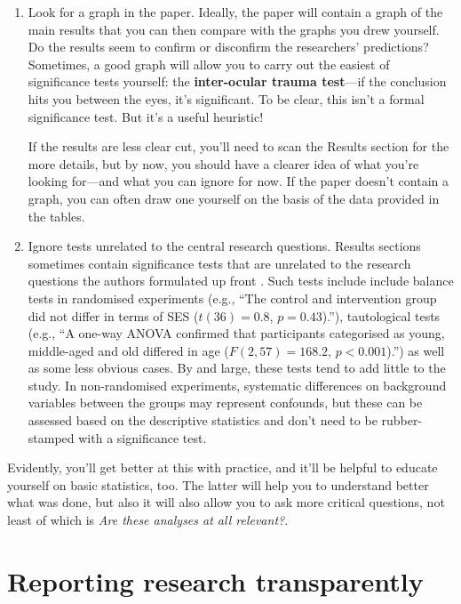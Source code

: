 \documentclass[a4paper]{tufte-book}\usepackage[]{graphicx}\usepackage[]{xcolor}
\newcommand{\term}[1]{\textbf{#1}}
\begin{document}
\begin{enumerate}
  Also see 
  \href{https://janhove.github.io/posts/2025-10-10-mock-outcomes/}{\textit{Clarifying research questions by sketching possible outcomes}}.
  
  \item Look for a graph in the paper.
Ideally, the paper will contain a graph of the main results 
that you can then compare with the graphs you drew yourself. 
Do the results seem to confirm or disconfirm the researchers' predictions? 
Sometimes, a good graph will allow you to carry out the easiest of significance tests yourself: 
the \term{inter-ocular trauma test}---if the conclusion hits you between the eyes, it's significant.
To be clear, this isn't a formal significance test. But it's a useful heuristic!

If the results are less clear cut, you'll need to scan the Results section 
for the more details, but by now, you should have a clearer idea of what you're 
looking for---and what you can ignore for now. If the paper doesn't contain a 
graph, you can often draw one yourself on the basis of the data provided in the tables.

\item Ignore tests unrelated to the central research questions.
Results sections sometimes contain significance tests that are unrelated to the 
research questions the authors formulated up front \citep[see][]{Vanhove2020b}. 
Such tests include include balance tests in randomised experiments 
(e.g., ``The control and intervention group did not differ in terms of SES 
($t(36) = 0.8$, $p = 0.43$).''), tautological tests (e.g., 
``A one-way ANOVA confirmed that participants categorised as young, 
middle-aged and old differed in age ($F(2, 57) = 168.2$, $p < 0.001$).'') 
as well as some less obvious cases. By and large, these tests tend to add 
little to the study. In non-randomised experiments, systematic differences 
on background variables between the groups may represent confounds, but these 
can be assessed based on the descriptive statistics and don't need to be 
rubber-stamped with a significance test.
\end{enumerate}

Evidently, you'll get better at this with practice,
and it'll be helpful to educate yourself on basic statistics, too.
The latter will help you to understand better what was done,
but also it will also allow you to ask more critical questions, not
least of which is \textit{Are these analyses at all relevant?}.


\chapter{Reporting research transparently}
\end{document}
